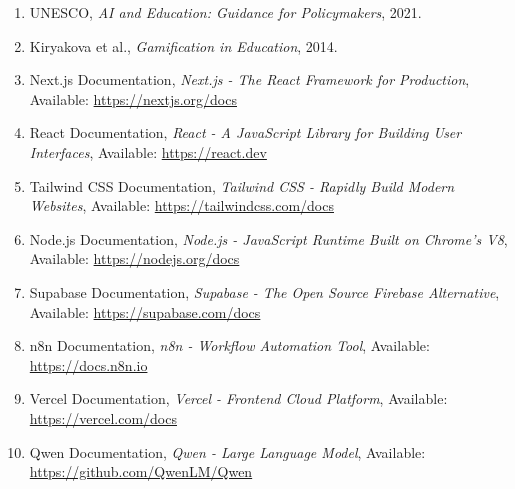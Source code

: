 \documentclass[12pt,a4paper]{report}
\begin{document}
\begin{enumerate}
    \item UNESCO, \textit{AI and Education: Guidance for Policymakers}, 2021.
    \item Kiryakova et al., \textit{Gamification in Education}, 2014.
    \item Next.js Documentation, \textit{Next.js - The React Framework for Production}, Available: \url{https://nextjs.org/docs}
    \item React Documentation, \textit{React - A JavaScript Library for Building User Interfaces}, Available: \url{https://react.dev}
    \item Tailwind CSS Documentation, \textit{Tailwind CSS - Rapidly Build Modern Websites}, Available: \url{https://tailwindcss.com/docs}
    \item Node.js Documentation, \textit{Node.js - JavaScript Runtime Built on Chrome's V8}, Available: \url{https://nodejs.org/docs}
    \item Supabase Documentation, \textit{Supabase - The Open Source Firebase Alternative}, Available: \url{https://supabase.com/docs}
    \item n8n Documentation, \textit{n8n - Workflow Automation Tool}, Available: \url{https://docs.n8n.io}
    \item Vercel Documentation, \textit{Vercel - Frontend Cloud Platform}, Available: \url{https://vercel.com/docs}
    \item Qwen Documentation, \textit{Qwen - Large Language Model}, Available: \url{https://github.com/QwenLM/Qwen}
\end{enumerate}
\end{document}
